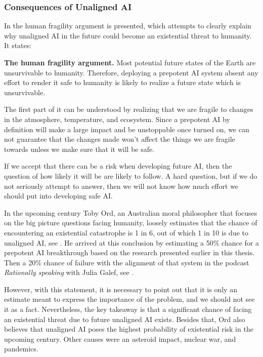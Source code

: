 \documentclass[12pt,A4]{report}
\theoremstyle{definition}
\begin{document}
\subsubsection{Consequences of Unaligned AI}
In \citet[p.19]{CritchKruger} the human fragility argument is presented, which attempts to clearly explain why unaligned AI in the future could become an existential threat to humanity. It states:
\begin{displayquote}
\textbf{The human fragility argument.} 
Most potential future states of the Earth are unsurvivable to humanity. Therefore, deploying a prepotent AI system absent any effort to render it safe to humanity is likely to realize a future state which is unsurvivable.
\end{displayquote}
The first part of it can be understood by realizing that we are fragile to changes in the atmosphere, temperature, and ecosystem. Since a prepotent AI by definition will make a large impact and be unstoppable once turned on, we can not guarantee that the changes made won't affect the things we are fragile towards unless we make sure that it will be safe. 

If we accept that there can be a risk when developing future AI, then the question of how likely it will be are likely to follow. A hard question, but if we do not seriously attempt to answer, then we will not know how much effort we should put into developing safe AI. 

In the upcoming century Toby Ord, an Australian moral philosopher that focuses on the big picture questions facing humanity, loosely estimates that the chance of encountering an existential catastrophe is 1 in 6, out of which 1 in 10 is due to unaligned  AI, see \citet[c.6]{Precipice}. He arrived at this conclusion by estimating a 50\% chance for a prepotent AI breakthrough based on the research presented earlier in this thesis. Then a 20\% chance of failure with the alignment of that system in the podcast \textit{Rationally speaking} with Julia Galef, see \citet[26:15]{RationallySpeaking}. 

However, with this statement, it is necessary to point out that it is only an estimate meant to express the importance of the problem, and we should not see it as a fact. Nevertheless, the key takeaway is that a significant chance of facing an existential threat due to future unaligned AI exists. Besides that, Ord also believes that unaligned AI poses the highest probability of existential risk in the upcoming century. Other causes were an asteroid impact, nuclear war, and pandemics. 
\end{document}
